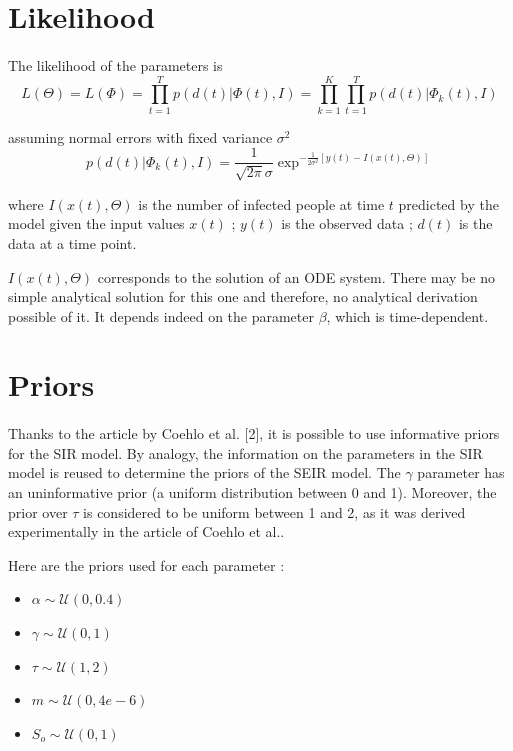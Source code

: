 \documentclass[11pt, a4paper]{article}
\begin{document}
\section{Likelihood}
\paragraph{}
The likelihood of the parameters is 
\begin{equation}
L(\Theta) = L(\Phi) = \prod_{t=1}^T p( d(t) | \Phi(t),I) = \prod_{k=1}^K \prod_{t=1}^T p( d(t) | \Phi_k(t),I) 
\end{equation}

assuming normal errors with fixed variance $\sigma^2$
\begin{equation}
p(d(t) | \Phi_k(t),I) = \frac{1}{\sqrt{2\pi}\sigma} \exp^{-\frac{1}{2\sigma^2}[y(t) - I(x(t), \Theta)]}
\end{equation}

where $I(x(t), \Theta)$ is the number of infected people at time $t$ predicted by the model given the input values $x(t)$ ; $y(t)$ is the observed data ; $d(t)$ is the data at a time point.

$I(x(t), \Theta)$ corresponds to the solution of an ODE system. There may be no simple analytical solution for this one and therefore, no analytical derivation possible of it. It depends indeed on the parameter $\beta$, which is time-dependent.

\section{Priors}
\paragraph{}
Thanks to the article by Coehlo et al. [2], it is possible to use informative priors for the SIR model. By analogy, the information on the parameters in the SIR model is reused to determine the priors of the SEIR model. The $\gamma$ parameter has an uninformative prior (a uniform distribution between 0 and 1). Moreover, the prior over $\tau$ is considered to be uniform between 1 and 2, as it was derived experimentally in the article of Coehlo et al.. 

Here are the priors used for each parameter : 
\begin{itemize}
\item $\alpha \sim \mathcal{U}(0, 0.4)$ 
\item $\gamma \sim \mathcal{U}(0, 1)$
\item $\tau \sim \mathcal{U}(1, 2)$
\item $m \sim  \mathcal{U}(0, 4e-6)$
\item $S_o \sim \mathcal{U}(0, 1)$
\end{itemize}
\end{document}
